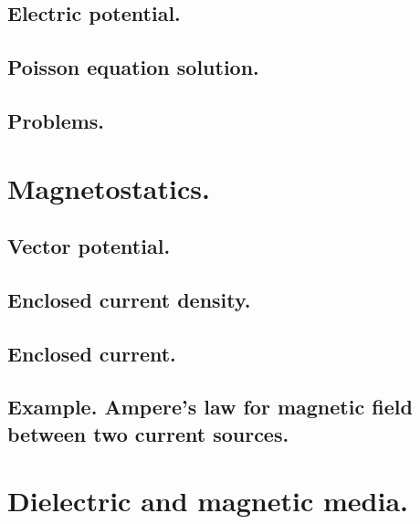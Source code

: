          \subsection{Electric potential.}
            
         \subsection{Poisson equation solution.}
            
         \subsection{Problems.}
            
      \section{Magnetostatics.}
         \subsection{Vector potential.}
            
         \subsection{Enclosed current density.}
            
         \subsection{Enclosed current.}
            
         \subsection{Example.  Ampere's law for magnetic field between two current sources.}
            
      \section{Dielectric and magnetic media.}
         

